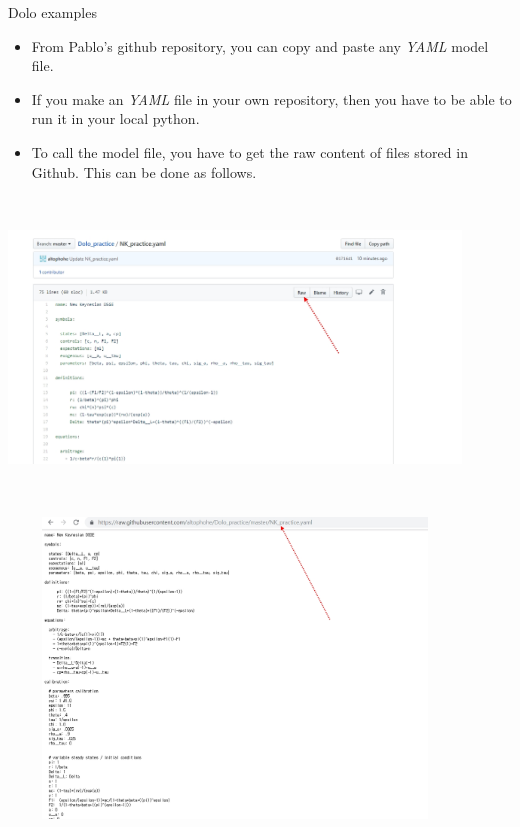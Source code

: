\documentclass{beamer}
\begin{document}
    \begin{frame}{Dolo examples}
        \begin{itemize}
            \item From Pablo's github repository, you can copy and paste any \textit{YAML} model file. 
            \item If you make an \textit{YAML} file in your own repository, then you have to be able to run it in your local python. 
            \item To call the model file, you have to get the raw content of files stored in Github. This can be done as follows. 
        \end{itemize}
    \end{frame}
     \begin{frame}{}
         \includegraphics[width=12cm, height= 8cm]{dolo8.jpg}
    \end{frame}
     \begin{frame}{}
         \includegraphics[width=12cm, height= 8cm]{dolo9.jpg}
    \end{frame}
\end{document}
